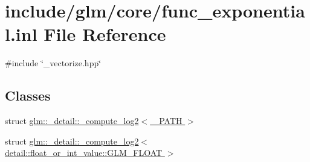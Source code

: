 \hypertarget{func__exponential_8inl}{\section{include/glm/core/func\-\_\-exponential.inl \-File \-Reference}
\label{func__exponential_8inl}
}
{\ttfamily \#include \char`\"{}\-\_\-vectorize.\-hpp\char`\"{}}\*
\subsection*{\-Classes}
\begin{DoxyCompactItemize}
\item 
struct \hyperlink{structglm_1_1__detail_1_1__compute__log2}{glm\-::\-\_\-detail\-::\-\_\-compute\-\_\-log2$<$ \-\_\-\-P\-A\-T\-H $>$}
\item 
struct \hyperlink{structglm_1_1__detail_1_1__compute__log2_3_01detail_1_1float__or__int__value_1_1GLM__FLOAT_01_4}{glm\-::\-\_\-detail\-::\-\_\-compute\-\_\-log2$<$ detail\-::float\-\_\-or\-\_\-int\-\_\-value\-::\-G\-L\-M\-\_\-\-F\-L\-O\-A\-T $>$}
\end{DoxyCompactItemize}
